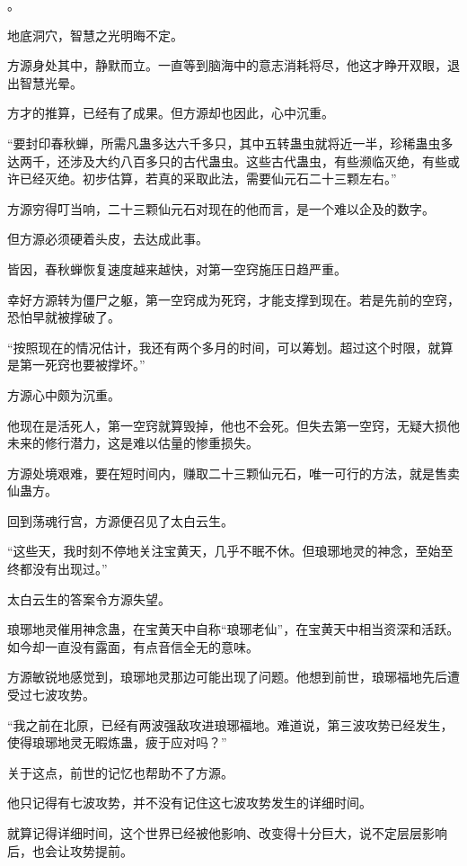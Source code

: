 
\begin{this_body}

。

地底洞穴，智慧之光明晦不定。

方源身处其中，静默而立。一直等到脑海中的意志消耗将尽，他这才睁开双眼，退出智慧光晕。

方才的推算，已经有了成果。但方源却也因此，心中沉重。

“要封印春秋蝉，所需凡蛊多达六千多只，其中五转蛊虫就将近一半，珍稀蛊虫多达两千，还涉及大约八百多只的古代蛊虫。这些古代蛊虫，有些濒临灭绝，有些或许已经灭绝。初步估算，若真的采取此法，需要仙元石二十三颗左右。”

方源穷得叮当响，二十三颗仙元石对现在的他而言，是一个难以企及的数字。

但方源必须硬着头皮，去达成此事。

皆因，春秋蝉恢复速度越来越快，对第一空窍施压日趋严重。

幸好方源转为僵尸之躯，第一空窍成为死窍，才能支撑到现在。若是先前的空窍，恐怕早就被撑破了。

“按照现在的情况估计，我还有两个多月的时间，可以筹划。超过这个时限，就算是第一死窍也要被撑坏。”

方源心中颇为沉重。

他现在是活死人，第一空窍就算毁掉，他也不会死。但失去第一空窍，无疑大损他未来的修行潜力，这是难以估量的惨重损失。

方源处境艰难，要在短时间内，赚取二十三颗仙元石，唯一可行的方法，就是售卖仙蛊方。

回到荡魂行宫，方源便召见了太白云生。

“这些天，我时刻不停地关注宝黄天，几乎不眠不休。但琅琊地灵的神念，至始至终都没有出现过。”

太白云生的答案令方源失望。

琅琊地灵催用神念蛊，在宝黄天中自称“琅琊老仙”，在宝黄天中相当资深和活跃。如今却一直没有露面，有点音信全无的意味。

方源敏锐地感觉到，琅琊地灵那边可能出现了问题。他想到前世，琅琊福地先后遭受过七波攻势。

“我之前在北原，已经有两波强敌攻进琅琊福地。难道说，第三波攻势已经发生，使得琅琊地灵无暇炼蛊，疲于应对吗？”

关于这点，前世的记忆也帮助不了方源。

他只记得有七波攻势，并不没有记住这七波攻势发生的详细时间。

就算记得详细时间，这个世界已经被他影响、改变得十分巨大，说不定层层影响后，也会让攻势提前。


\end{this_body}
